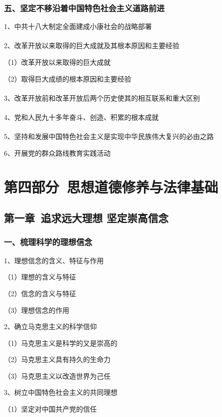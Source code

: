 \documentclass{ctexart}
\begin{document}
\subsubsection{五、坚定不移沿着中国特色社会主义道路前进}

1、中共十八大制定全面建成小康社会的战略部署
\\\\

2、改革开放以来取得的巨大成就及其根本原因和主要经验

（1）改革开放以来取得的巨大成就

（2）取得巨大成绩的根本原因和主要经验
\\\\

3、改革开放前和改革开放后两个历史使其的相互联系和重大区别
\\\\

4、党和人民九十多年奋斗、创造、积累的根本成就
\\\\

5、坚持和发展中国特色社会主义是实现中华民族伟大复兴的必由之路

6、开展党的群众路线教育实践活动

\section{第四部分\ 思想道德修养与法律基础}


\subsection{第一章\ 追求远大理想 坚定崇高信念}
\subsubsection{一、梳理科学的理想信念}
1、理想信念的含义、特征与作用

（1）理想的含义与特征

（2）信念的含义与特征

（3）理想信念的作用

2、确立马克思主义的科学信仰

（1）马克思主义是科学的又是崇高的

（2）马克思主义具有持久的生命力

（3）马克思主义以改造世界为己任

3、树立中国特色社会主义的共同理想

（1）坚定对中国共产党的信任
\end{document}
